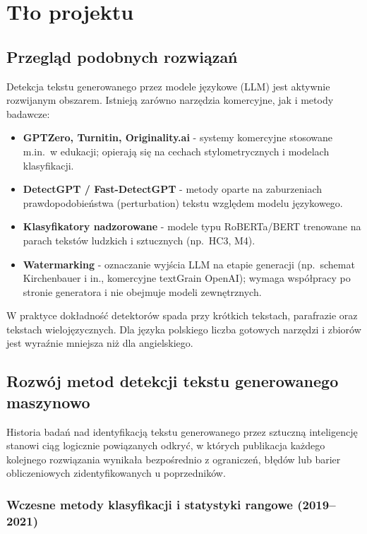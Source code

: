 \section{Tło projektu}

\subsection{Przegląd podobnych rozwiązań}

Detekcja tekstu generowanego przez modele językowe (LLM) jest aktywnie rozwijanym obszarem. Istnieją zarówno narzędzia komercyjne, jak i metody badawcze:

\begin{itemize}
	\item \textbf{GPTZero, Turnitin, Originality.ai} - systemy komercyjne stosowane m.in.\ w edukacji; opierają się na cechach stylometrycznych i modelach klasyfikacji.
	\item \textbf{DetectGPT / Fast-DetectGPT} - metody oparte na zaburzeniach prawdopodobieństwa (perturbation) tekstu względem modelu językowego.
	\item \textbf{Klasyfikatory nadzorowane} - modele typu RoBERTa/BERT trenowane na parach tekstów ludzkich i sztucznych (np.\ HC3, M4).
	\item \textbf{Watermarking} - oznaczanie wyjścia LLM na etapie generacji (np.\ schemat Kirchenbauer i in., komercyjne textGrain OpenAI); wymaga współpracy po stronie generatora i nie obejmuje modeli zewnętrznych.
\end{itemize}

W praktyce dokładność detektorów spada przy krótkich tekstach, parafrazie oraz tekstach wielojęzycznych. Dla języka polskiego liczba gotowych narzędzi i zbiorów jest wyraźnie mniejsza niż dla angielskiego.

\subsection{Rozwój metod detekcji tekstu generowanego maszynowo}

Historia badań nad identyfikacją tekstu generowanego przez sztuczną inteligencję stanowi ciąg logicznie powiązanych odkryć, w których publikacja każdego kolejnego rozwiązania wynikała bezpośrednio z ograniczeń, błędów lub barier obliczeniowych zidentyfikowanych u poprzedników.

\subsubsection{Wczesne metody klasyfikacji i statystyki rangowe (2019--2021)}

